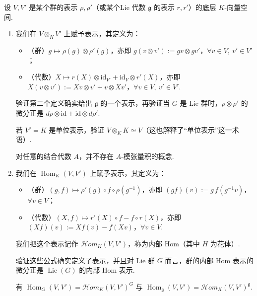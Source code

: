 \begin{numpara}\label{np:ssl-2-1-5}
设 $V, V'$ 是某个群的表示 $\rho, \rho'$（或某个Lie 代数 $\mathfrak{g}$ 的表示 $r, r'$）的底层 $K$-向量空间.
\begin{enumerate}[label=\roman*)]
\item 我们在 $V \otimes_K V'$ 上赋予表示，其定义为：
\begin{itemize}[label=\textendash]
\item （群）$g \mapsto \rho(g) \otimes \rho'(g)$，亦即 $g(v \otimes v') := gv \otimes gv'$，$\forall v \in V,\ v' \in V'$；
\item （代数）$X \mapsto r(X) \otimes \mathrm{id}_{V'} + \mathrm{id}_V \otimes r'(X)$，亦即 $X(v \otimes v') := Xv \otimes v' + v \otimes Xv'$，$\forall v \in V,\ v' \in V'$.
\end{itemize}
\begin{exercise*}
验证第二个定义确实给出 $\mathfrak{g}$ 的一个表示，再验证当 $G$ 是 Lie 群时，$\rho \otimes \rho'$ 的微分正是 $d\rho \otimes \mathrm{id} + \mathrm{id} \otimes d\rho'$.
\end{exercise*}
\begin{exercise*}
若 $V' = K$ 是单位表示，验证 $V \otimes_K K \simeq V$（这也解释了``单位表示''这一术语）.
\end{exercise*}
\begin{remark*}
对任意的结合代数 $A$，并不存在 $A$-模张量积的概念.
\end{remark*}
\item 我们在 $\operatorname{Hom}_K(V, V')$ 上赋予表示，其定义为：
\begin{itemize}[label=\textendash]
\item （群）$(g, f) \mapsto \rho'(g) \circ f \circ \rho(g^{-1})$，亦即 $(gf)(v) := g\,f(g^{-1}v)$，$\forall v \in V$；
\item （代数）$(X, f) \mapsto r'(X) \circ f - f \circ r(X)$，亦即 $(Xf)(v) := Xf(v) - f(Xv)$，$\forall v \in V$.
\end{itemize}
我们把这个表示记作 $\mathcal{H}om_K(V, V')$，称为内部 $\mathrm{Hom}$（其中 $H$ 为花体）.
\begin{exercise*}
验证这些公式确实定义了表示，并且对 Lie 群 $G$ 而言，群的内部 $\mathrm{Hom}$ 表示的微分正是 $\operatorname{Lie}(G)$ 的内部 $\mathrm{Hom}$ 表示.
\end{exercise*}
\begin{remark*}
有 $\operatorname{Hom}_G(V, V') = \mathcal{H}om_K(V, V')^{G}$ 与 $\operatorname{Hom}_{\mathfrak{g}}(V, V') = \mathcal{H}om_K(V, V')^{\mathfrak{g}}$.

\end{remark*}
\end{enumerate}
\end{numpara}
